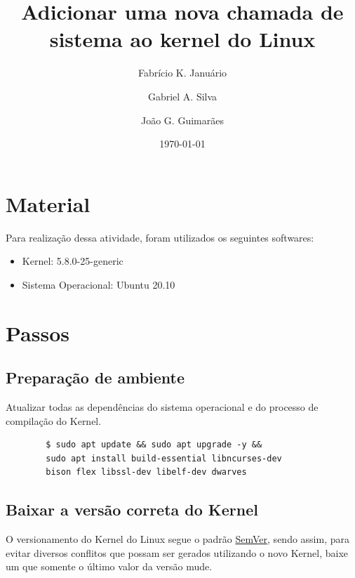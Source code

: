 \documentclass[12pt, a4paper]{article}
\title{\textbf{Adicionar uma nova chamada de sistema ao kernel do Linux}}
\author{
    Fabrício K. Januário
    \and
    Gabriel A. Silva
    \and
	João G. Guimarães
}
\date{\today}
\begin{document}
	\maketitle

	\vspace{\baselineskip}

	\section{Material}

	\par Para realização dessa atividade, foram utilizados os seguintes softwares:

	\begin{itemize}
	    \item Kernel: 5.8.0-25-generic
	    \item Sistema Operacional: Ubuntu 20.10
	\end{itemize}
	
	\section{Passos}
	
	\subsection{Preparação de ambiente} 
	
	\par Atualizar todas as dependências do sistema operacional e do processo de compilação do Kernel.

	\begin{verbatim}
	    $ sudo apt update && sudo apt upgrade -y &&
	    sudo apt install build-essential libncurses-dev
	    bison flex libssl-dev libelf-dev dwarves
	\end{verbatim}
	
	\subsection{Baixar a versão correta do Kernel}
	
	\par O versionamento do Kernel do Linux segue o padrão \href{https://semver.org/lang/pt-BR/}{SemVer}, sendo assim, para evitar diversos conflitos que possam ser gerados utilizando o novo Kernel, baixe um que somente o último valor da versão mude.
	
	\vspace{\baselineskip}
	
\end{document}
